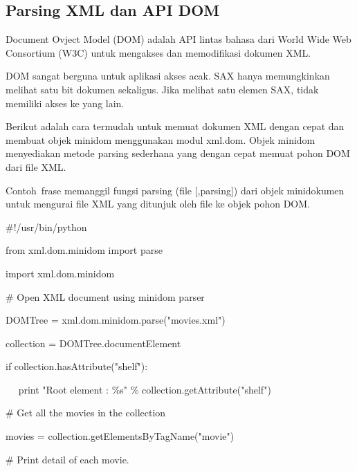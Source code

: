 \documentclass{wileySix}
\begin{document}
\begin{myEnumerate}
{\section{Parsing XML dan API DOM}
\par
\noindent 
\hspace*{0.5in} Document Ovject Model (DOM) adalah API lintas bahasa dari World Wide Web Consortium (W3C) untuk mengakses dan memodifikasi dokumen XML. \par
\noindent 
\hspace*{0.5in} DOM sangat berguna untuk aplikasi akses acak. SAX hanya memungkinkan melihat satu bit dokumen sekaligus. Jika melihat satu elemen SAX, tidak memiliki akses ke yang lain. \par
\noindent 
\hspace*{0.5in} Berikut adalah cara termudah untuk memuat dokumen XML dengan cepat dan membuat objek minidom menggunakan modul xml.dom. Objek minidom menyediakan metode parsing sederhana yang dengan cepat memuat pohon DOM dari file XML. \par
\noindent 
\hspace*{0.5in} Contoh~frase memanggil fungsi  parsing (file [,parsing]) dari objek minidokumen untuk mengurai file XML yang ditunjuk oleh file ke objek pohon DOM. \par
\noindent 
$  \#  $!/usr/bin/python \par
\vspace{12pt}
\noindent 
from xml.dom.minidom import parse \par
\noindent 
import xml.dom.minidom \par
\vspace{12pt}
\noindent 
$  \#  $ Open XML document using minidom parser \par
\noindent 
DOMTree = xml.dom.minidom.parse("movies.xml") \par
\noindent 
collection = DOMTree.documentElement \par
\noindent 
if collection.hasAttribute("shelf"): \par
\noindent 
~~ print "Root element :  $  \%  $s"  $  \%  $ collection.getAttribute("shelf") \par
\vspace{12pt}
\noindent 
$  \#  $ Get all the movies in the collection \par
\noindent 
movies = collection.getElementsByTagName("movie") \par
\vspace{12pt}
\noindent 
$  \#  $ Print detail of each movie. \par
}
\end{myEnumerate}
\end{document}
